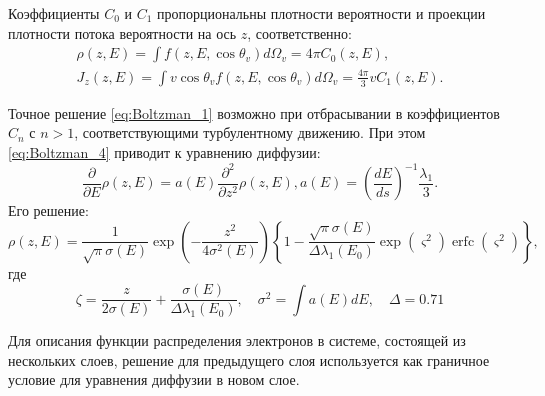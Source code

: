 Коэффициенты $C_0$ и $C_1$ пропорциональны плотности вероятности и проекции плотности потока вероятности на ось $z$, соответственно:
\begin{equation} \label{eq:Boltzman_6}
	\begin{gathered}
		\rho(z, E)=\int f\left(z, E, \cos \theta_v\right) d \Omega_v=4 \pi C_0(z, E), \\
		J_z(z, E)=\int v \cos \theta_v f\left(z, E, \cos \theta_v\right) d \Omega_v=\frac{4 \pi}{3} v C_1(z, E).
	\end{gathered}
\end{equation}

Точное решение \ref{eq:Boltzman_1} возможно при отбрасывании в  коэффициентов $C_n$ с \break $n>1$, соответствующими турбулентному движению. При этом \ref{eq:Boltzman_4} приводит к уравнению диффузии:
\begin{equation} \label{eq:Boltzman_7}
	\frac{\partial}{\partial E} \rho(z, E)=a(E) \frac{\partial^2}{\partial z^2} \rho(z, E), a(E)=\left(\frac{d E}{d s}\right)^{-1} \frac{\lambda_1}{3} .
\end{equation}
Его решение:
\begin{equation} \label{eq:Boltzman_8}
	\rho(z, E)=\frac{1}{\sqrt{\pi} \sigma(E)} \exp \left(-\frac{z^2}{4 \sigma^2(E)}\right)\left\{1-\frac{\sqrt{\pi} \sigma(E)}{\Delta \lambda_1\left(E_0\right)} \exp \left(\varsigma^2\right) \operatorname{erfc}\left(\varsigma^2\right)\right\},
\end{equation}
где
\begin{equation} \label{eq:Boltzman_9}
	\zeta=\frac{z}{2 \sigma(E)}+\frac{\sigma(E)}{\Delta \lambda_1\left(E_0\right)}, \quad \sigma^2=\int a(E) d E, \quad \Delta=0.71
\end{equation}

Для описания функции распределения электронов в системе, состоящей из нескольких слоев, решение для предыдущего слоя используется как граничное условие для уравнения диффузии в новом слое.


